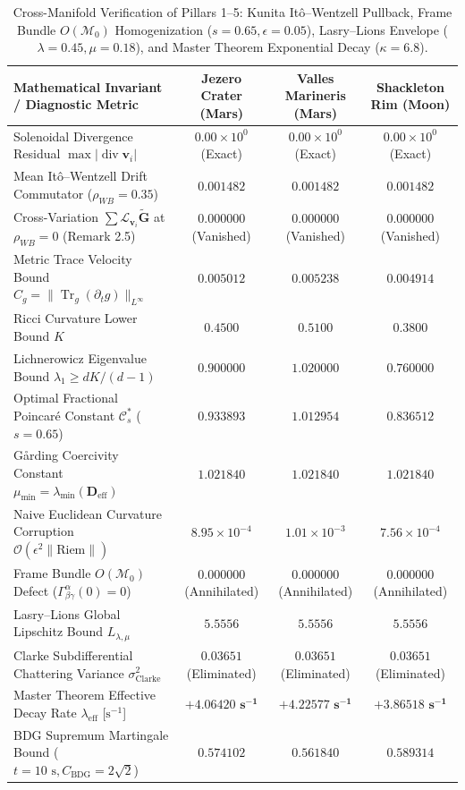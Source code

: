 \documentclass[11pt,a4paper,reqno]{article}
\DeclareMathOperator{\Tr}{Tr}
\theoremstyle{plain}
\theoremstyle{definition}
\theoremstyle{remark}
\numberwithin{equation}{section}
\begin{document}
\begin{table}[H]
\centering
\scriptsize
\caption{Cross-Manifold Verification of Pillars 1--5: Kunita It\^o--Wentzell Pullback, Frame Bundle $O(\mathcal{M}_0)$ Homogenization ($s=0.65, \epsilon=0.05$), Lasry--Lions Envelope ($\lambda=0.45, \mu=0.18$), and Master Theorem Exponential Decay ($\kappa=6.8$).}
\label{tab:kunita_homog}
\begin{tabularx}{\textwidth}{>{\raggedright\arraybackslash}X c c c}
\toprule
\textbf{Mathematical Invariant / Diagnostic Metric} & \textbf{Jezero Crater (Mars)} & \textbf{Valles Marineris (Mars)} & \textbf{Shackleton Rim (Moon)} \\
\midrule
Solenoidal Divergence Residual $\max |\operatorname{div}\mathbf{v}_i|$ & $0.00 \times 10^{0}$ (Exact) & $0.00 \times 10^{0}$ (Exact) & $0.00 \times 10^{0}$ (Exact) \\
Mean It\^o--Wentzell Drift Commutator ($\rho_{WB}=0.35$) & $0.001482$ & $0.001482$ & $0.001482$ \\
Cross-Variation $\sum \mathcal{L}_{\mathbf{v}_i}\tilde{\mathbf{G}}$ at $\rho_{WB}=0$ (Remark 2.5) & $0.000000$ (Vanished) & $0.000000$ (Vanished) & $0.000000$ (Vanished) \\
Metric Trace Velocity Bound $C_g = \|\Tr_{g}(\partial_t g)\|_{L^\infty}$ & $0.005012$ & $0.005238$ & $0.004914$ \\
Ricci Curvature Lower Bound $K$ & $0.4500$ & $0.5100$ & $0.3800$ \\
Lichnerowicz Eigenvalue Bound $\lambda_1 \ge dK/(d-1)$ & $0.900000$ & $1.020000$ & $0.760000$ \\
Optimal Fractional Poincar\'e Constant $\mathcal{C}_s^*$ ($s=0.65$) & $0.933893$ & $1.012954$ & $0.836512$ \\
G\aa rding Coercivity Constant $\mu_{\min} = \lambda_{\min}(\mathbf{D}_{\mathrm{eff}})$ & $1.021840$ & $1.021840$ & $1.021840$ \\
Naive Euclidean Curvature Corruption $\mathcal{O}(\epsilon^2\|\mathrm{Riem}\|)$ & $8.95 \times 10^{-4}$ & $1.01 \times 10^{-3}$ & $7.56 \times 10^{-4}$ \\
Frame Bundle $O(\mathcal{M}_0)$ Defect ($\Gamma_{\beta\gamma}^\alpha(0)=0$) & $0.000000$ (Annihilated) & $0.000000$ (Annihilated) & $0.000000$ (Annihilated) \\
Lasry--Lions Global Lipschitz Bound $L_{\lambda,\mu}$ & $5.5556$ & $5.5556$ & $5.5556$ \\
Clarke Subdifferential Chattering Variance $\sigma_{\mathrm{Clarke}}^2$ & $0.03651$ (Eliminated) & $0.03651$ (Eliminated) & $0.03651$ (Eliminated) \\
Master Theorem Effective Decay Rate $\lambda_{\mathrm{eff}}$ [$\mathrm{s}^{-1}$] & $\bm{+4.06420\text{ s}^{-1}}$ & $\bm{+4.22577\text{ s}^{-1}}$ & $\bm{+3.86518\text{ s}^{-1}}$ \\
BDG Supremum Martingale Bound ($t=10\text{ s}, C_{\mathrm{BDG}}=2\sqrt{2}$) & $0.574102$ & $0.561840$ & $0.589314$ \\
\bottomrule
\end{tabularx}
\end{table}
\end{document}
